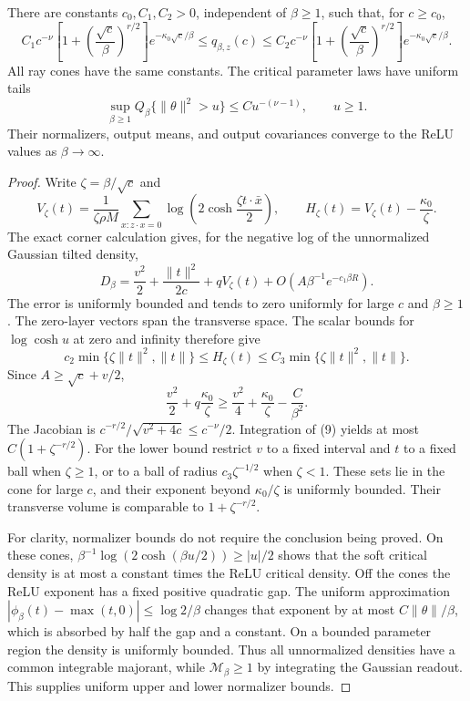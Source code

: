 \documentclass[11pt]{article}
\begin{document}
\begin{lemma}\label{lem:corner}
There are constants $c_0,C_1,C_2>0$, independent of $\beta\ge1$, such
that, for $c\ge c_0$,
\[
 C_1 c^{-\nu}\left[1+\left(\frac{\sqrt c}{\beta}\right)^{r/2}\right]
 e^{-\kappa_0\sqrt c/\beta}
 \le q_{\beta,z}(c)\le
 C_2 c^{-\nu}\left[1+\left(\frac{\sqrt c}{\beta}\right)^{r/2}\right]
 e^{-\kappa_0\sqrt c/\beta}.                          \tag{5}
\]
All ray cones have the same constants. The critical parameter laws have
uniform tails
\[
 \sup_{\beta\ge1}Q_\beta\{\|\theta\|^2>u\}
                       \le Cu^{-(\nu-1)},\qquad u\ge1. \tag{6}
\]
Their normalizers, output means, and output covariances converge to the
ReLU values as $\beta\to\infty$.
\end{lemma}
\begin{proof}
Write $\zeta=\beta/\sqrt c$ and
\[
 V_\zeta(t)=\frac1{\zeta\rho M}
       \sum_{x:z\cdot x=0}\log\left(2\cosh\frac{\zeta t\cdot\bar x}{2}\right),
 \qquad H_\zeta(t)=V_\zeta(t)-\frac{\kappa_0}{\zeta}.
 \tag{7}
\]
The exact corner calculation gives, for the negative log of the
unnormalized Gaussian tilted density,
\[
 D_\beta=\frac{v^2}{2}+\frac{\|t\|^2}{2c}
                    +qV_\zeta(t)+O(A\beta^{-1}e^{-c_1\beta R}). \tag{8}
\]
The error is uniformly bounded and tends to zero uniformly for large
$c$ and $\beta\ge1$. The zero-layer vectors span the transverse space.
The scalar bounds for $\log\cosh u$ at zero and infinity therefore give
\[
 c_2\min\{\zeta\|t\|^2,\|t\|\}
 \le H_\zeta(t)\le
 C_3\min\{\zeta\|t\|^2,\|t\|\}.                    \tag{9}
\]
Since $A\ge\sqrt c+v/2$,
\[
       \frac{v^2}{2}+q\frac{\kappa_0}{\zeta}
       \ge\frac{v^2}{4}+\frac{\kappa_0}{\zeta}
                                      -\frac{C}{\beta^2}.
\]
The Jacobian is $c^{-r/2}/\sqrt{v^2+4c}\le c^{-\nu}/2$.
Integration of (9) yields at most $C(1+\zeta^{-r/2})$.
For the lower bound restrict $v$ to a fixed interval and $t$ to a
fixed ball when $\zeta\ge1$, or to a ball of radius
$c_3\zeta^{-1/2}$ when $\zeta<1$. These sets lie in the cone for
large $c$, and their exponent beyond $\kappa_0/\zeta$ is uniformly
bounded. Their transverse volume is comparable to
$1+\zeta^{-r/2}$.

For clarity, normalizer bounds do not require the conclusion being
proved. On these cones, $\beta^{-1}\log(2\cosh(\beta u/2))\ge|u|/2$
shows that the soft critical density is at most a constant times the
ReLU critical density. Off the cones the ReLU exponent has a fixed
positive quadratic gap. The uniform approximation
$|\phi_\beta(t)-\max(t,0)|\le\log2/\beta$ changes that exponent by at
most $C\|\theta\|/\beta$, which is absorbed by half the gap and a
constant. On a bounded parameter region the density is uniformly
bounded. Thus all unnormalized densities have a common integrable
majorant, while $\mathcal M_\beta\ge1$ by integrating the Gaussian
readout. This supplies uniform upper and lower normalizer bounds.


\end{proof}
\end{document}
